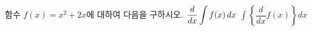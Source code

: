 함수 $f(x)=x^2+2x$에 대하여 다음을 구하시오.
 $\dfrac{d}{dx}\displaystyle\int f(x)\mkern3mu dx$
 $\displaystyle\int\left\{\dfrac{d}{dx}f(x)\right\}dx$
